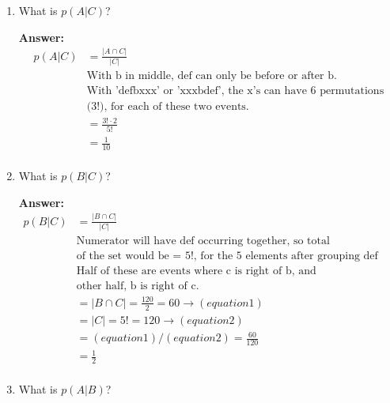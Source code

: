 \documentclass[14pt]{extreport}
\newcommand{\answer}[0]{\medskip \textbf{Answer:} \medskip}
\newcommand{\intersect}[0]{\cap}
\begin{document}
\begin{enumerate}[label=(\alph*)]
\begin{enumerate}
                \item What is $p(A|C)$?
                
                \answer \\
                \begin{align*}
                    p(A|C)  &=  \frac{|A \intersect C|}{|C|}\\
                            &   \text{With b in middle, def can only be before or after b.} \\
                            &   \text{With 'defbxxx' or 'xxxbdef', the x's can have 6 permutations}\\
                            &   \text{(3!), for each of these two events.}\\
                            &=  \frac{3!\cdot2}{5!}\\
                            &=  \frac{1}{10}\\
                \end{align*}
                
                \item What is $p(B|C)$?
                
                \answer \\
                \begin{align*}
                    p(B|C)  &=  \frac{|B \intersect C|}{|C|}\\
                            &   \text{Numerator will have def occurring together, so total permutations} \\
                            &   \text{of the set would be = 5!, for the 5 elements after grouping def}\\
                            &   \text{Half of these are events where c is right of b, and} \\
                            &   \text{other half, b is right of c.}\\
                            &=  |B \intersect C| = \frac{120}{2} = 60 \rightarrow (equation1)\\
                            &=  |C| = 5! = 120 \rightarrow (equation2)\\
                            &=  (equation1)/(equation2) = \frac{60}{120}\\
                            &=  \frac{1}{2}\\
                \end{align*}
    
                \item What is $p(A|B)$?
                

\end{enumerate}
\end{enumerate}
\end{document}
